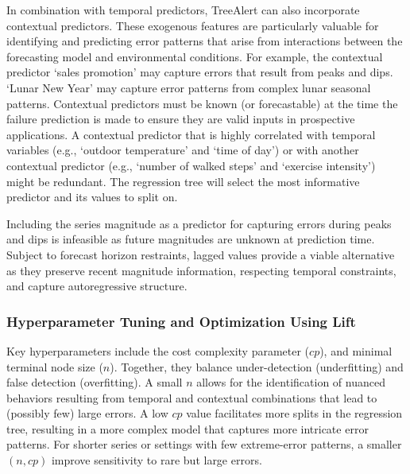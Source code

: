 \documentclass[12pt]{article}
\begin{document}
In combination with temporal predictors, TreeAlert can also incorporate contextual predictors. These exogenous features are particularly valuable for identifying and predicting error patterns that arise from interactions between the forecasting model and environmental conditions. For example, the contextual predictor ‘sales promotion’ may capture errors that result from peaks and dips. `Lunar New Year' may capture error patterns from complex lunar seasonal patterns. Contextual predictors must be known (or forecastable) at the time the failure prediction is made to ensure they are valid inputs in prospective applications. A contextual predictor that is highly correlated with temporal variables (e.g., `outdoor temperature' and `time of day') or with another contextual predictor (e.g., `number of walked steps' and `exercise intensity') might be redundant. The regression tree will select the most informative predictor and its values to split on.

Including the series magnitude as a predictor for capturing errors during peaks and dips is infeasible as future magnitudes are unknown at prediction time. Subject to forecast horizon restraints, lagged values provide a viable alternative as they preserve recent magnitude information, respecting temporal constraints, and capture autoregressive structure.


\subsubsection{Hyperparameter Tuning and Optimization Using Lift}
\label{sec:tuning_optimization}

Key hyperparameters include the cost complexity parameter ($cp$), and minimal terminal node size ($n$). Together, they balance under-detection (underfitting) and false detection (overfitting). A small $n$ allows for the identification of nuanced behaviors resulting from temporal and contextual combinations that lead to (possibly few) large errors. A low $cp$ value facilitates more splits in the regression tree, resulting in a more complex model that captures more intricate error patterns. For shorter series or settings with few extreme-error patterns, a smaller $(n, cp)$ improve sensitivity to rare but large errors.
\end{document}
